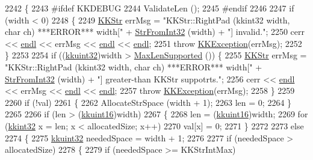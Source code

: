 \begin{DoxyCode}
2242 \{
2243 \textcolor{preprocessor}{  #ifdef  KKDEBUG}
2244   ValidateLen ();
2245 \textcolor{preprocessor}{  #endif}
2246 
2247   \textcolor{keywordflow}{if}  (width < 0)
2248   \{
2249     \hyperlink{class_k_k_b_1_1_k_k_str}{KKStr} errMsg = \textcolor{stringliteral}{"KKStr::RightPad (kkint32  width,  char ch)    ***ERROR***   width["} + 
      \hyperlink{namespace_k_k_b_a66adf53f607bda7ab0d3e1c3945e792e}{StrFromInt32} (width) + \textcolor{stringliteral}{"]  invalid."};
2250     cerr << \hyperlink{namespace_k_k_b_ad1f50f65af6adc8fa9e6f62d007818a8}{endl} << errMsg << \hyperlink{namespace_k_k_b_ad1f50f65af6adc8fa9e6f62d007818a8}{endl} << \hyperlink{namespace_k_k_b_ad1f50f65af6adc8fa9e6f62d007818a8}{endl};
2251     \textcolor{keywordflow}{throw} \hyperlink{class_k_k_b_1_1_k_k_exception}{KKException}(errMsg);
2252   \}
2253 
2254   \textcolor{keywordflow}{if}  ((\hyperlink{namespace_k_k_b_af8d832f05c54994a1cce25bd5743e19a}{kkuint32})width > \hyperlink{class_k_k_b_1_1_k_k_str_a7056de4de4ea9fee5276b4c9f5a71943}{MaxLenSupported} ())  \{
2255     \hyperlink{class_k_k_b_1_1_k_k_str}{KKStr} errMsg = \textcolor{stringliteral}{"KKStr::RightPad (kkint32  width,  char ch)    ***ERROR***   width["} + 
      \hyperlink{namespace_k_k_b_a66adf53f607bda7ab0d3e1c3945e792e}{StrFromInt32} (width) + \textcolor{stringliteral}{"]  greater-than KKStr suppotrts."};
2256     cerr << \hyperlink{namespace_k_k_b_ad1f50f65af6adc8fa9e6f62d007818a8}{endl} << errMsg << \hyperlink{namespace_k_k_b_ad1f50f65af6adc8fa9e6f62d007818a8}{endl} << \hyperlink{namespace_k_k_b_ad1f50f65af6adc8fa9e6f62d007818a8}{endl};
2257     \textcolor{keywordflow}{throw} \hyperlink{class_k_k_b_1_1_k_k_exception}{KKException}(errMsg);
2258   \}
2259 
2260   \textcolor{keywordflow}{if}  (!val)
2261   \{
2262     AllocateStrSpace (width + 1);
2263     len = 0;
2264   \}
2265 
2266   \textcolor{keywordflow}{if}  (len > (\hyperlink{namespace_k_k_b_aa8c7d4d30381c8a0b6fce68974a9c8a9}{kkuint16})width)
2267   \{
2268     len = (\hyperlink{namespace_k_k_b_aa8c7d4d30381c8a0b6fce68974a9c8a9}{kkuint16})width;
2269     \textcolor{keywordflow}{for}  (\hyperlink{namespace_k_k_b_a8fa4952cc84fda1de4bec1fbdd8d5b1b}{kkint32} x = len;  x < allocatedSize;  x++)
2270       val[x] = 0;
2271   \}
2272 
2273   \textcolor{keywordflow}{else}
2274   \{
2275     \hyperlink{namespace_k_k_b_af8d832f05c54994a1cce25bd5743e19a}{kkuint32}  neededSpace = width + 1;
2276 
2277     \textcolor{keywordflow}{if}  (neededSpace > allocatedSize)
2278     \{
2279       \textcolor{keywordflow}{if}  (neededSpace >= KKStrIntMax)

\end{DoxyCode}
